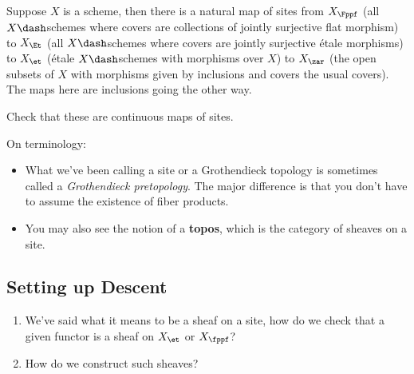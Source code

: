 \begin{example}[?]

Suppose \(X\) is a scheme, then there is a natural map of sites from
\(X_{\Fppf}\) (all \(X\dash\)schemes where covers are collections of
jointly surjective flat morphism) to \(X_{\Et}\) (all \(X\dash\)schemes
where covers are jointly surjective étale morphisms) to \(X_{\et}\)
(étale \(X\dash\)schemes with morphisms over \(X\)) to \(X_{\zar}\) (the
open subsets of \(X\) with morphisms given by inclusions and covers the
usual covers). The maps here are inclusions going the other way.

\end{example}

\begin{exercise}[Check!]

Check that these are continuous maps of sites.

\end{exercise}

\begin{remark}

\envlist

On terminology:

\begin{itemize}
\item
  What we've been calling a site or a Grothendieck topology is sometimes
  called a \emph{Grothendieck pretopology}. The major difference is that
  you don't have to assume the existence of fiber products.
\item
  You may also see the notion of a \textbf{topos}, which is the category
  of sheaves on a site.
\end{itemize}

\end{remark}

\hypertarget{setting-up-descent}{%
\subsection{Setting up Descent}\label{setting-up-descent}}

\begin{question}

\envlist

\begin{enumerate}
\def\labelenumi{\arabic{enumi}.}
\item
  We've said what it means to be a sheaf on a site, how do we check that
  a given functor is a sheaf on \(X_{\et}\) or \(X_{\fppf}\)?
\item
  How do we construct such sheaves?
\end{enumerate}

\end{question}

